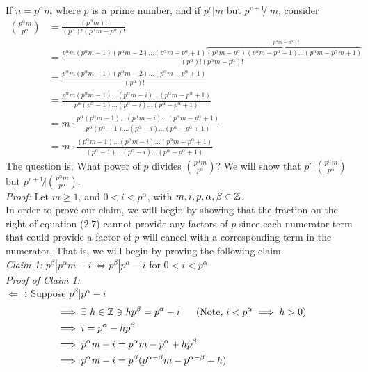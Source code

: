 If $n=p^\alpha m$ where $p$ is a prime number, and if $p^r|m$ but $p^{r+1}\not | \ m$, consider
\begin{align}
    {p^\alpha m \choose p^\alpha} &= \frac{(p^\alpha m)!}{(p^\alpha)!(p^\alpha m - p^\alpha)!} \nonumber \\
    &= \frac{p^\alpha m (p^\alpha m -1)(p^\alpha m - 2)\dots(p^\alpha m - p^\alpha + 1)\overbrace{(p^\alpha m - p^\alpha)(p^\alpha m -p^\alpha -1)\dots(p^\alpha m - p^\alpha m + 1)}^{(p^\alpha m -p^\alpha)!}}{(p^\alpha)!(p^\alpha m -p^\alpha)!} \nonumber \\
    &= \frac{p^\alpha m (p^\alpha m -1)(p^\alpha m - 2)\dots(p^\alpha m - p^\alpha + 1)}{(p^\alpha)!} \nonumber \\
    &= \frac{p^\alpha m (p^\alpha m -1) \dots (p^\alpha m - i) \dots (p^\alpha m - p^\alpha +1)}{p^\alpha (p^\alpha -1) \dots (p^\alpha - i) \dots (p^\alpha - p^\alpha +1)} \nonumber \\
    &= m\cdot \frac{p^\alpha (p^\alpha m -1) \dots (p^\alpha m - i) \dots (p^\alpha m - p^\alpha +1)}{p^\alpha (p^\alpha -1) \dots (p^\alpha - i) \dots (p^\alpha - p^\alpha +1)} \nonumber \\ 
    &= m\cdot \frac{ (p^\alpha m -1) \dots (p^\alpha m - i) \dots (p^\alpha m - p^\alpha +1)}{ (p^\alpha -1) \dots (p^\alpha - i) \dots (p^\alpha - p^\alpha +1)} 
\end{align}
The question is, What power of $p$ divides ${p^\alpha m \choose p^\alpha}$? We will show that $p^r | {p^\alpha m \choose p^\alpha}$ but $p^{r+1} \not | {p^\alpha m \choose p^\alpha}$. \steezybreak\\
\textit{Proof:} Let $m\geq 1$, and $0<i<p^\alpha$, with $m,i,p,\alpha,\beta \in {\mathbb{ Z}}$. \steezybreak\\ In order to prove our claim, we will begin by showing that the fraction on the right of equation (2.7) cannot provide any factors of $p$ since each numerator term that could provide a factor of $p$ will cancel with a corresponding term in the numerator. That is, we will begin by proving the following claim. \steezybreak\\
\textit{Claim 1: } $p^\beta | p^\alpha m - i \ \iff p^\beta | p^\alpha - i$  for $0<i<p^\alpha$\steezybreak\\
\textit{Proof of Claim 1:}\steezybreak\\
\textbf{$\Leftarrow$ :} Suppose $p^\beta | p^\alpha -i $
\begin{align}
  &\implies \exists \ h \in \Z \ni hp^\beta = p^\alpha - i \ \ \ \ \ (\text{Note, }i<p^\alpha \implies h > 0)\nonumber \\
  &\implies i = p^\alpha - hp^\beta \nonumber \\
  &\implies p^\alpha m -i = p^\alpha m - p^\alpha + hp^\beta \nonumber \\
  &\implies p^\alpha m -i = p^\beta (p^{\alpha-\beta}m-p^{\alpha-\beta}+h) \nonumber
\end{align}
